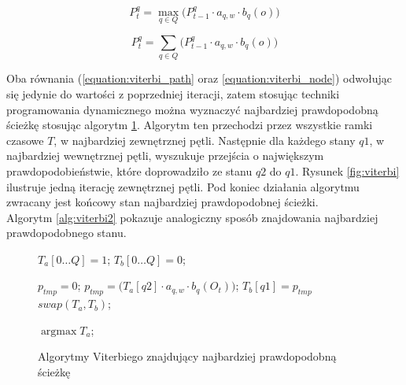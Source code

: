 \documentclass[11pt]{article}
\DeclareMathOperator*{\argmax}{\arg\max}   %
\begin{document}
		   \begin{equation}
		   P_t^q=\max_{q \in Q} \bigg( P_{t-1}^q\cdot a_{q,w}\cdot b_q(o) \bigg)
		   \label{equation:viterbi_path}
		   \end{equation}
		   
		   \begin{equation}
		   P_t^q=\sum_{q \in Q} \bigg( P_{t-1}^q\cdot a_{q,w}\cdot b_q(o) \bigg)
		   \label{equation:viterbi_node}
		   \end{equation}
		   
		  Oba równania (\ref{equation:viterbi_path} oraz \ref{equation:viterbi_node}) odwołując się jedynie do wartości z poprzedniej iteracji, zatem stosując techniki programowania dynamicznego można wyznaczyć najbardziej prawdopodobną ścieżkę stosując algorytm \ref{alg:viterbi}. Algorytm ten przechodzi przez wszystkie ramki czasowe $T$, w najbardziej zewnętrznej pętli. Następnie dla każdego stany $q1$, w najbardziej wewnętrznej pętli, wyszukuje przejścia o największym prawdopodobieństwie, które doprowadziło ze stanu $q2$ do $q1$. Rysunek \ref{fig:viterbi} ilustruje jedną iterację zewnętrznej pętli. Pod koniec działania algorytmu zwracany jest końcowy stan najbardziej prawdopodobnej ścieżki. \\
		  Algorytm \ref{alg:viterbi2} pokazuje analogiczny sposób znajdowania najbardziej prawdopodobnego stanu.
		
		  \begin{figure}
			   \begin{algorithmic}[1]
				   	
					   	
					   	\STATE $T_a[0 \ldots Q] = 1$;
					   	\STATE $T_b[0 \ldots Q] = 0$;
					   	
							   	\STATE $p_{tmp} = 0$;
									   	\STATE $p_{tmp} = \bigg( T_a[q2]\cdot a_{q,w}\cdot b_q(O_t) \bigg)$;
								   	\ENDIF
							   	\ENDFOR
							   	\STATE $T_b[q1] = p_{tmp}$
						   	\ENDFOR
						   	\STATE $swap(T_a, T_b)$;
					   	\ENDFOR
					   	
					   	\RETURN $\argmax{T_a}$;
			   \end{algorithmic}
		  \caption{Algorytmy Viterbiego znajdujący najbardziej prawdopodobną ścieżkę}
		  \label{alg:viterbi}
		  \end{figure}		
	  
\end{document}
